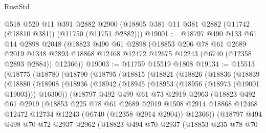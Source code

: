 \begin{lexlean}{RustStd}
\begin{coremodule}
    @518
    @520
    @11
    @391
    @2882
    @2900
    (@18805 @381 @11 @381 @2882 (@11742 (@18810 @381)) (@11750 (@11751 @2882)))
@19001 := @18797
    @490
    @133
    @61
    @14
    @2898
    @2048
    (@18823
      @490
      @61
      @2898
      (@18853
        @206
        @78
        @61
        @2689
        @2019
        @1348
        @2893
        @18868
        @12468
        @12472
        @12675
        @12243
        (@6740 (@12358 @2893 @2884))
        @12366))
@19003 := @11759 @15519 @1808
@19134 := @15513
    (@18775
      (@18780
        (@18790
          (@18795
            (@18815
              (@18821
                (@18826
                  (@18836
                    (@18839
                      (@18880
                        (@18908
                          (@18936
                            (@18942
                              (@18945 (@18953 (@18956 (@18973 (@19001 @19003))) @16300))
                              (@18797
                                @492
                                @499
                                @61
                                @73
                                @2919
                                @2963
                                (@18823
                                  @492
                                  @61
                                  @2919
                                  (@18853
                                    @225
                                    @78
                                    @61
                                    @2689
                                    @2019
                                    @1508
                                    @2914
                                    @18868
                                    @12468
                                    @12472
                                    @12734
                                    @12243
                                    (@6740 (@12358 @2914 @2904))
                                    @12366))
                                (@18797
                                  @494
                                  @498
                                  @70
                                  @72
                                  @2937
                                  @2962
                                  (@18823
                                    @494
                                    @70
                                    @2937
                                    (@18853
                                      @235
                                      @78
                                      @70

\end{coremodule}
\end{lexlean}
